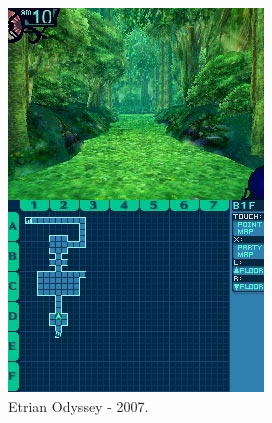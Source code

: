 \begin{figure}[h!]
  \centering
  \begin{subfigure}[b]{0.36\linewidth}
    \includegraphics[width=\linewidth]{eo.jpg}
     \caption{Etrian Odyssey - 2007.}
  \end{subfigure}
  \begin{subfigure}[b]{0.44\linewidth}

\end{subfigure}
\end{figure}
